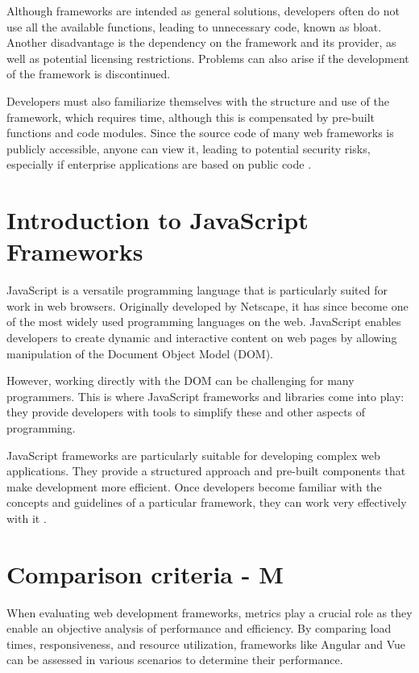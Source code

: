 Although frameworks are intended as general solutions, developers often do not use all the available functions, leading to unnecessary code, known as bloat. Another disadvantage is the dependency on the framework and its provider, as well as potential licensing restrictions. Problems can also arise if the development of the framework is discontinued.

Developers must also familiarize themselves with the structure and use of the framework, which requires time, although this is compensated by pre-built functions and code modules. Since the source code of many web frameworks is publicly accessible, anyone can view it, leading to potential security risks, especially if enterprise applications are based on public code \cite{ionos_webframeworks}.

\section{Introduction to JavaScript Frameworks}

JavaScript is a versatile programming language that is particularly suited for work in web browsers. Originally developed by Netscape, it has since become one of the most widely used programming languages on the web. JavaScript enables developers to create dynamic and interactive content on web pages by allowing manipulation of the Document Object Model (DOM).

However, working directly with the DOM can be challenging for many programmers. This is where JavaScript frameworks and libraries come into play: they provide developers with tools to simplify these and other aspects of programming.

JavaScript frameworks are particularly suitable for developing complex web applications. They provide a structured approach and pre-built components that make development more efficient. Once developers become familiar with the concepts and guidelines of a particular framework, they can work very effectively with it \cite{ionos_jsframeworks}.

\section {Comparison criteria - M}

When evaluating web development frameworks, metrics play a crucial role as they enable an objective analysis of performance and efficiency. By comparing load times, responsiveness, and resource utilization, frameworks like Angular and Vue can be assessed in various scenarios to determine their performance.


